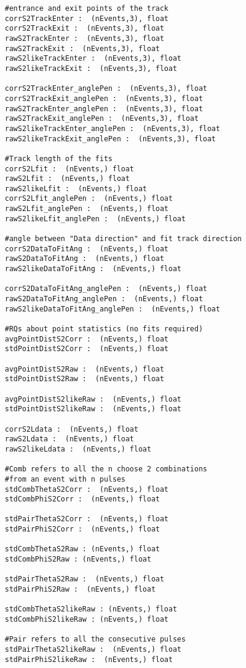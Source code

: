 \begin{Verbatim}[fontsize=\footnotesize]
#entrance and exit points of the track
corrS2TrackEnter :  (nEvents,3), float 
corrS2TrackExit :  (nEvents,3), float 
rawS2TrackEnter :  (nEvents,3), float 
rawS2TrackExit :  (nEvents,3), float
rawS2likeTrackEnter :  (nEvents,3), float 
rawS2likeTrackExit :  (nEvents,3), float

corrS2TrackEnter_anglePen :  (nEvents,3), float 
corrS2TrackExit_anglePen :  (nEvents,3), float 
rawS2TrackEnter_anglePen :  (nEvents,3), float 
rawS2TrackExit_anglePen :  (nEvents,3), float
rawS2likeTrackEnter_anglePen :  (nEvents,3), float
rawS2likeTrackExit_anglePen :  (nEvents,3), float

#Track length of the fits
corrS2Lfit :  (nEvents,) float 
rawS2Lfit :  (nEvents,) float
rawS2likeLfit :  (nEvents,) float
corrS2Lfit_anglePen :  (nEvents,) float 
rawS2Lfit_anglePen :  (nEvents,) float
rawS2likeLfit_anglePen :  (nEvents,) float

#angle between "Data direction" and fit track direction
corrS2DataToFitAng :  (nEvents,) float 
rawS2DataToFitAng :  (nEvents,) float 
rawS2likeDataToFitAng :  (nEvents,) float 

corrS2DataToFitAng_anglePen :  (nEvents,) float 
rawS2DataToFitAng_anglePen :  (nEvents,) float 
rawS2likeDataToFitAng_anglePen :  (nEvents,) float 

#RQs about point statistics (no fits required)
avgPointDistS2Corr :  (nEvents,) float
stdPointDistS2Corr :  (nEvents,) float

avgPointDistS2Raw :  (nEvents,) float
stdPointDistS2Raw :  (nEvents,) float

avgPointDistS2likeRaw :  (nEvents,) float
stdPointDistS2likeRaw :  (nEvents,) float

corrS2Ldata :  (nEvents,) float 
rawS2Ldata :  (nEvents,) float
rawS2likeLdata :  (nEvents,) float

#Comb refers to all the n choose 2 combinations 
#from an event with n pulses
stdCombThetaS2Corr :  (nEvents,) float 
stdCombPhiS2Corr :  (nEvents,) float 

stdPairThetaS2Corr :  (nEvents,) float 
stdPairPhiS2Corr :  (nEvents,) float 

stdCombThetaS2Raw : (nEvents,) float
stdCombPhiS2Raw : (nEvents,) float

stdPairThetaS2Raw :  (nEvents,) float
stdPairPhiS2Raw :  (nEvents,) float

stdCombThetaS2likeRaw : (nEvents,) float
stdCombPhiS2likeRaw : (nEvents,) float

#Pair refers to all the consecutive pulses
stdPairThetaS2likeRaw :  (nEvents,) float
stdPairPhiS2likeRaw :  (nEvents,) float


\end{Verbatim}
